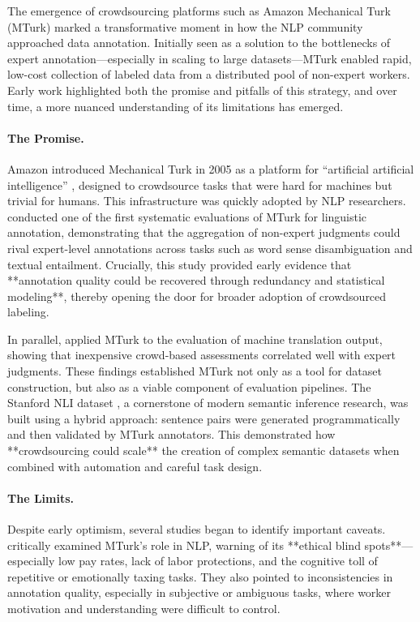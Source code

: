 The emergence of crowdsourcing platforms such as Amazon Mechanical Turk (MTurk) marked a transformative moment in how the NLP community approached data annotation. Initially seen as a solution to the bottlenecks of expert annotation—especially in scaling to large datasets—MTurk enabled rapid, low-cost collection of labeled data from a distributed pool of non-expert workers. Early work highlighted both the promise and pitfalls of this strategy, and over time, a more nuanced understanding of its limitations has emerged.

\paragraph{The Promise.} Amazon introduced Mechanical Turk in 2005 as a platform for ``artificial artificial intelligence'' \citep{borthwick2005mechanical}, designed to crowdsource tasks that were hard for machines but trivial for humans. This infrastructure was quickly adopted by NLP researchers. \citet{snow2008cheap} conducted one of the first systematic evaluations of MTurk for linguistic annotation, demonstrating that the aggregation of non-expert judgments could rival expert-level annotations across tasks such as word sense disambiguation and textual entailment. Crucially, this study provided early evidence that **annotation quality could be recovered through redundancy and statistical modeling**, thereby opening the door for broader adoption of crowdsourced labeling.

In parallel, \citet{callison2009fast} applied MTurk to the evaluation of machine translation output, showing that inexpensive crowd-based assessments correlated well with expert judgments. These findings established MTurk not only as a tool for dataset construction, but also as a viable component of evaluation pipelines. The Stanford NLI dataset \citep{bowman2015large}, a cornerstone of modern semantic inference research, was built using a hybrid approach: sentence pairs were generated programmatically and then validated by MTurk annotators. This demonstrated how **crowdsourcing could scale** the creation of complex semantic datasets when combined with automation and careful task design.

\paragraph{The Limits.} Despite early optimism, several studies began to identify important caveats. \citet{fort2011amazon} critically examined MTurk's role in NLP, warning of its **ethical blind spots**—especially low pay rates, lack of labor protections, and the cognitive toll of repetitive or emotionally taxing tasks. They also pointed to inconsistencies in annotation quality, especially in subjective or ambiguous tasks, where worker motivation and understanding were difficult to control.

